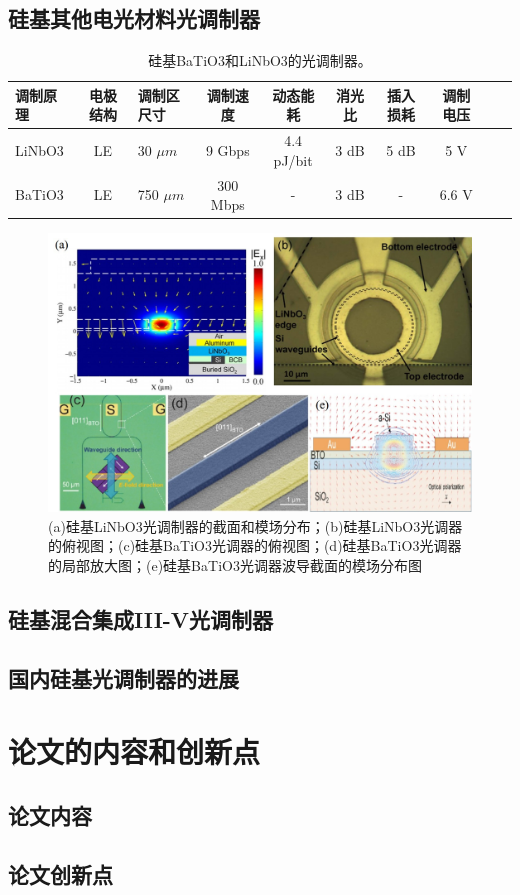 \subsection{硅基其他电光材料光调制器}
{
	\begin{table}[htb]
		\caption{硅基BaTiO3和LiNbO3的光调制器。}
		\label{sil_graphene_mod}
		\centering
		\begin{tabular}[t]{p{1.5cm}cp{1.2cm}ccccccc}
			\hline
			调制原理  & 电极结构 & 调制区尺寸 & 调制速度 & 动态能耗 & 消光比 & 插入损耗 & 调制电压\\
			\hline
			LiNbO3\cite{chen2014hybrid} & LE  & 30 $\mu m$ & 9 Gbps & 4.4 pJ/bit & 3 dB & 5 dB & 5 V\\
			BaTiO3\cite{xiong2014active} & LE  & 750 $\mu m$ & 300 Mbps & - & 3 dB & - & 6.6 V\\
			\hline
		\end{tabular}
	\end{table}
}
\begin{figure}[htb]
	\centering
	\includegraphics[width=12cm]{./Pictures/fig_othter_mod.jpg}
	\caption{ (a)硅基LiNbO3光调制器的截面和模场分布\cite{chen2014hybrid}；(b)硅基LiNbO3光调器的俯视图\cite{palmer2014high}；(c)硅基BaTiO3光调器的俯视图\cite{xiong2014active}；(d)硅基BaTiO3光调器的局部放大图\cite{xiong2014active}；(e)硅基BaTiO3光调器波导截面的模场分布图\cite{xiong2014active}}
	\label{fig_othter_mod.jpg}
\end{figure}
\subsection{硅基混合集成III-V光调制器}

\subsection{国内硅基光调制器的进展}
\section{论文的内容和创新点}

\subsection{论文内容}
\subsection{论文创新点}


